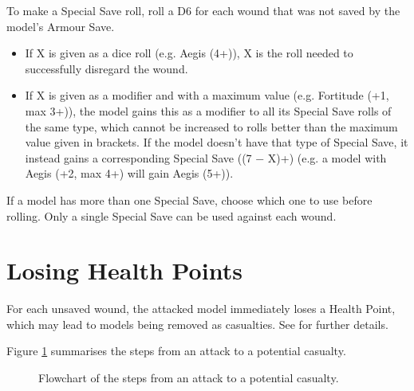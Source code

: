 To make a Special Save roll, roll a D6 for each wound that was not saved by the model's Armour Save.
\begin{itemize}
\item If X is given as a dice roll (e.g. Aegis (4+)), X is the roll needed to successfully disregard the wound.
\item If X is given as a modifier and with a maximum value (e.g. Fortitude (+1, max 3+)), the model gains this as a modifier to all its Special Save rolls of the same type, which cannot be increased to rolls better than the maximum value given in brackets. If the model doesn't have that type of Special Save, it instead gains a corresponding Special Save ((7 − X)+) (e.g. a model with Aegis (+2, max 4+) will gain Aegis (5+)).
\end{itemize}

If a model has more than one Special Save, choose which one to use before rolling. Only a single Special Save can be used against each wound.

\section{Losing Health Points}
\label{loosing_health_points}

For each unsaved wound, the attacked model immediately loses a Health Point, which may lead to models being removed as casualties. See  for further details.

Figure \ref{figure/attack_procedure} summarises the steps from an attack to a potential casualty.

\newcommand{\figATPAttack}{Attack}
\newcommand{\figATPTohitroll}{To-hit\\ roll}
\newcommand{\figATPHit}{Hit}
\newcommand{\figATPTowoundroll}{To-wound\\ roll}
\newcommand{\figATPWound}{Wound}
\newcommand{\figATPArmoursave}{Armour\\ Save}
\newcommand{\figATPSpecialsave}{Special\\ Save}
\newcommand{\figATPUnsavedwound}{Unsaved\\ wound}
\newcommand{\figATPApplymultiplewounds}{Apply\\ Multiple Wounds}
\newcommand{\figATPHealthpointloss}{Health Point\\ loss}
\newcommand{\figATPCasualty}{Casualty}

\begin{figure}[!htbp]
	\centering
	
	\caption{Flowchart of the steps from an attack to a potential casualty.}
	\label{figure/attack_procedure}
\end{figure}
